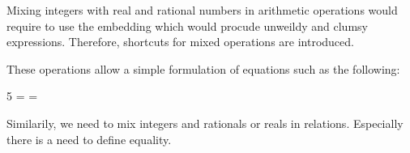 \documentclass[12pt]{article}
\begin{document}
Mixing integers with real and rational numbers in arithmetic
operations would require to use the embedding which would procude
unweildy and clumsy expressions. Therefore, shortcuts for mixed
operations are introduced.
%

These operations allow a simple formulation of equations such as the
following:

\begin{zed}
 5 \azmult \atwo = \aten {} = \aten
\end{zed}
%
Similarily, we need to mix integers and rationals or reals in
relations. Especially there is a need to define equality.
\end{document}
